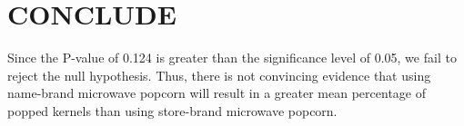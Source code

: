 \documentclass{article}
\begin{document}
\section*{CONCLUDE}

Since the P-value of 0.124 is greater than the significance level of 0.05, we fail to reject the null hypothesis. Thus,
there is not convincing evidence that using name-brand microwave popcorn will result in a greater mean percentage of 
popped kernels than using store-brand microwave popcorn.
\end{document}
